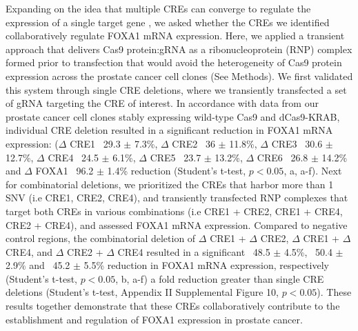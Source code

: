 Expanding on the idea that multiple CREs can converge to regulate the expression of a single target gene \cite{sallariConvergenceDispersedRegulatory2016,baileyNoncodingSomaticInherited2016,pennacchioEnhancersFiveEssential2013}, we asked whether the CREs we identified collaboratively regulate FOXA1 mRNA expression.
Here, we applied a transient approach that delivers Cas9 protein:gRNA as a ribonucleoprotein (RNP) complex formed prior to transfection that would avoid the heterogeneity of Cas9 protein expression across the prostate cancer cell clones (See Methods).
We first validated this system through single CRE deletions, where we transiently transfected a set of gRNA targeting the CRE of interest.
In accordance with data from our prostate cancer cell clones stably expressing wild-type Cas9 and dCas9-KRAB, individual CRE deletion resulted in a significant reduction in FOXA1 mRNA expression: ($\Delta$ CRE1 ~29.3 $\pm$ 7.3\%, $\Delta$ CRE2 ~36 $\pm$ 11.8\%, $\Delta$ CRE3 ~30.6 $\pm$ 12.7\%, $\Delta$ CRE4 ~24.5 $\pm$ 6.1\%, $\Delta$ CRE5 ~23.7 $\pm$ 13.2\%, $\Delta$ CRE6 ~26.8 $\pm$ 14.2\% and $\Delta$ FOXA1 ~96.2 $\pm$ 1.4\% reduction (Student’s t-test, $p<0.05$, a, a-f).
Next for combinatorial deletions, we prioritized the CREs that harbor more than 1 SNV (i.e CRE1, CRE2, CRE4), and transiently transfected RNP complexes that target both CREs in various combinations (i.e CRE1 + CRE2, CRE1 + CRE4, CRE2 + CRE4), and assessed FOXA1 mRNA expression.
Compared to negative control regions, the combinatorial deletion of $\Delta$ CRE1 + $\Delta$ CRE2, $\Delta$ CRE1 + $\Delta$ CRE4, and $\Delta$ CRE2 + $\Delta$ CRE4 resulted in a significant ~48.5 $\pm$ 4.5\%, ~50.4 $\pm$ 2.9\% and ~45.2 $\pm$ 5.5\% reduction in FOXA1 mRNA expression, respectively (Student’s t-test, $p<0.05$, b, a-f) a fold reduction greater than single CRE deletions (Student’s t-test, Appendix II Supplemental Figure 10, $p<0.05$).
These results together demonstrate that these CREs collaboratively contribute to the establishment and regulation of FOXA1 expression in prostate cancer.

